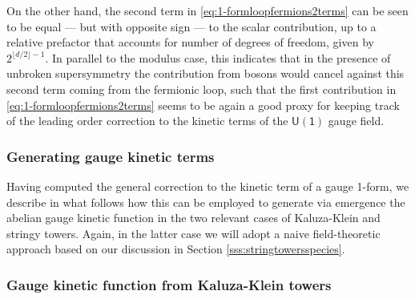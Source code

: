 %
On the other hand, the second term in \eqref{eq:1-formloopfermions2terms} can be seen to be equal --- but with opposite sign --- to the scalar contribution, up to a relative prefactor that accounts for number of degrees of freedom, given by $2^{\lfloor d/2 \rfloor-1}$. In parallel to the modulus case, this indicates that in the presence of unbroken supersymmetry the contribution from bosons would cancel against this second term coming from the fermionic loop, such that the first contribution in \eqref{eq:1-formloopfermions2terms} seems to be again a good proxy for keeping track of the leading order correction to the kinetic terms of the $\mathsf{U(1)}$ gauge field.
	
	
\subsubsection{Generating gauge kinetic terms}
\label{sss:emergenceU(1)}

Having computed the general correction to the kinetic term of a gauge 1-form, we describe in what follows how this can be employed to generate via emergence the abelian gauge kinetic function in the two relevant cases of Kaluza-Klein and stringy towers. Again, in the latter case we will adopt a naive field-theoretic approach based on our discussion in Section \ref{sss:stringtowersspecies}.

\subsubsection*{Gauge kinetic function from Kaluza-Klein towers}

